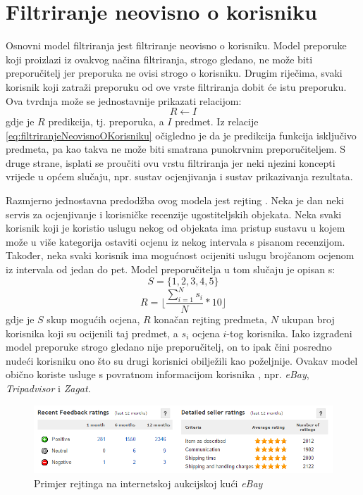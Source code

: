 \documentclass[times, utf8, diplomski, numeric]{fer}
\begin{document}
\section{Filtriranje neovisno o korisniku}
Osnovni model filtriranja jest filtriranje neovisno o korisniku. Model preporuke
koji proizlazi iz ovakvog načina filtriranja, strogo gledano, ne može biti
preporučitelj jer preporuka ne ovisi strogo o korisniku. Drugim riječima, svaki
korisnik koji zatraži preporuku od ove vrste filtriranja dobit će istu
preporuku. Ova tvrdnja može se jednostavnije prikazati relacijom:
\begin{equation}
\label{eq:filtriranjeNeovisnoOKorisniku}
	R \leftarrow I
\end{equation}
gdje je $R$ predikcija, tj. preporuka, a $I$ predmet. Iz relacije
\ref{eq:filtriranjeNeovisnoOKorisniku} očigledno je da je predikcija funkcija
isključivo predmeta, pa kao takva ne može biti smatrana punokrvnim
preporučiteljem. S druge strane, isplati se proučiti ovu vrstu filtriranja jer
neki njezini koncepti vrijede u općem slučaju, npr. sustav ocjenjivanja i sustav
prikazivanja rezultata.

Razmjerno jednostavna predodžba ovog modela jest rejting . Neka je
dan neki servis za ocjenjivanje i korisničke recenzije ugostiteljskih objekata.
Neka svaki korisnik koji je koristio uslugu nekog od objekata ima pristup
sustavu u kojem može u više kategorija ostaviti ocjenu iz nekog intervala s
pisanom recenzijom. Također, neka svaki korisnik ima mogućnost ocijeniti uslugu
brojčanom ocjenom iz intervala od jedan do pet. Model preporučitelja u tom
slučaju je opisan s:
\begin{equation}
\label{eq:skupOcjena}
	S = \{1, 2, 3, 4, 5\}
\end{equation}
\begin{equation}
\label{eq:prosjek}
	R = \lfloor \frac{\sum_{i=1}^{N} s_i}{N} \ast 10 \rfloor
\end{equation}
gdje je $S$ skup mogućih ocjena, $R$ konačan rejting predmeta, $N$ ukupan broj
korisnika koji su ocijenili taj predmet, a $s_i$ ocjena $i$-tog korisnika. Iako
izgrađeni model preporuke strogo gledano nije preporučitelj, on to ipak čini
posredno nudeći korisniku ono što su drugi korisnici obilježili kao poželjnije.
Ovakav model obično koriste usluge s povratnom informacijom korisnika
, npr. \emph{eBay}, \emph{Tripadvisor} i \emph{Zagat}.

\begin{figure}[!htb]
	\centering
	\includegraphics[width=14.21cm]{images/neosobni/ebay1.png}
	\caption{Primjer rejtinga na internetskoj aukcijskoj kući \emph{eBay}}
	\label{fig:Ebay1}
\end{figure}
\end{document}
